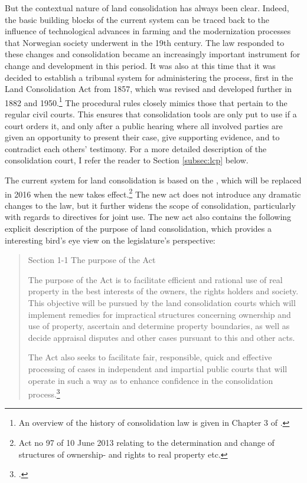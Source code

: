 But the contextual nature of land consolidation has always been clear. Indeed, the basic building blocks of the current system can be traced back to the influence of technological advances in farming and the modernization processes that Norwegian society underwent in the 19th century. The law responded to these changes and consolidation became an increasingly important instrument for change and development in this period. It was also at this time that it was decided to establish a tribunal system for administering the process, first in the Land Consolidation Act from 1857, which was revised and developed further in 1882 and 1950.\footnote{An overview of the history of consolidation law is given in Chapter 3 of \cite{prop12}.} The procedural rules closely mimics those that pertain to the regular civil courts. This ensures that consolidation tools are only put to use if a court orders it, and only after a public hearing where all involved parties are given an opportunity to present their case, give supporting evidence, and to contradict each others' testimony. For a more detailed description of the consolidation court, I refer the reader to Section \ref{subsec:lcp} below.

The current system for land consolidation is based on the \cite{lca79}, which will be replaced in 2016 when the new \cite{lca13} takes effect.\footnote{Act no 97 of 10 June 2013 relating to the determination and change of structures of ownership- and rights to real property etc.} The new act does not introduce any dramatic changes to the law, but it further widens the scope of consolidation, particularly with regards to directives for joint use. The new act also contains the following explicit description of the purpose of land consolidation, which provides a interesting bird's eye view on the legislature's perspective:

\begin{quote}
Section 1-1 The purpose of the Act

The purpose of the Act is to facilitate efficient and rational use of real property in the best interests of the owners, the rights holders and society. This objective will be pursued by the land consolidation courts which will implement remedies for impractical structures concerning ownership and use of property, ascertain and determine property boundaries, as well as decide appraisal disputes and other cases pursuant to this and other acts.

The Act also seeks to facilitate fair, responsible, quick and effective processing of cases in independent and impartial public courts that will operate in such a way as to enhance confidence in the consolidation process.\footcite[1]{lca13}
\end{quote}

